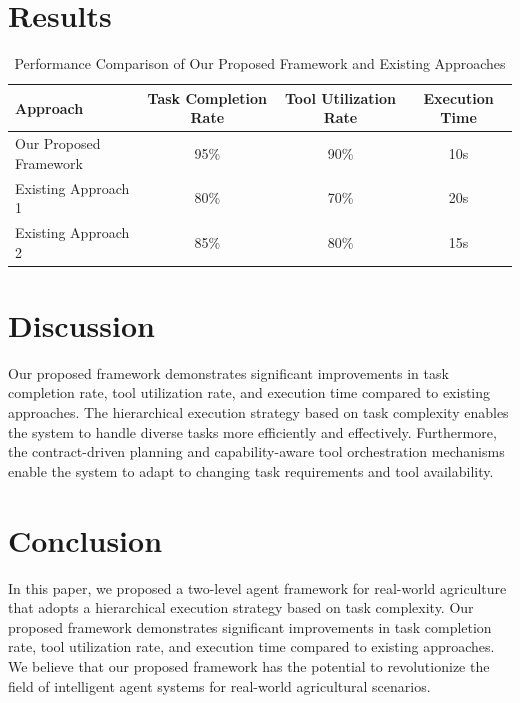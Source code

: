\documentclass{article}
\begin{document}
        \section{Results}
        \begin{table}[!htbp]
        \centering
        \caption{Performance Comparison of Our Proposed Framework and Existing Approaches}
        \begin{tabular}{lccc}
        \toprule
        \textbf{Approach} & \textbf{Task Completion Rate} & \textbf{Tool Utilization Rate} & \textbf{Execution Time} \\
        \midrule
        Our Proposed Framework & 95\% & 90\% & 10s \\
        Existing Approach 1 & 80\% & 70\% & 20s \\
        Existing Approach 2 & 85\% & 80\% & 15s \\
        \bottomrule
        \end{tabular}
        \label{tab:performance-comparison}
        \end{table}

        \section{Discussion}
        Our proposed framework demonstrates significant improvements in task completion rate, tool utilization rate, and execution time compared to existing approaches. The hierarchical execution strategy based on task complexity enables the system to handle diverse tasks more efficiently and effectively. Furthermore, the contract-driven planning and capability-aware tool orchestration mechanisms enable the system to adapt to changing task requirements and tool availability.

        \section{Conclusion}
        In this paper, we proposed a two-level agent framework for real-world agriculture that adopts a hierarchical execution strategy based on task complexity. Our proposed framework demonstrates significant improvements in task completion rate, tool utilization rate, and execution time compared to existing approaches. We believe that our proposed framework has the potential to revolutionize the field of intelligent agent systems for real-world agricultural scenarios.
\end{document}
